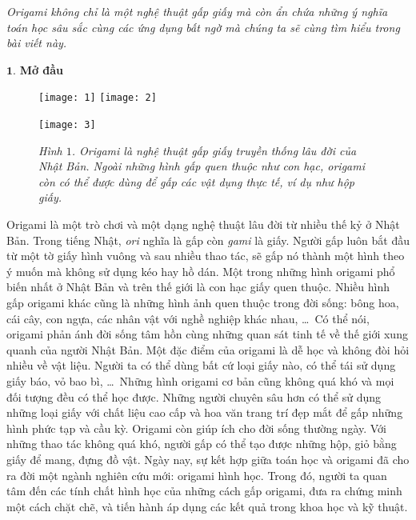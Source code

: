 \textit{Origami không chỉ là một nghệ thuật gấp giấy mà còn ẩn chứa những ý nghĩa toán học sâu sắc cùng các ứng dụng bất ngờ mà chúng ta sẽ cùng tìm hiểu trong bài viết này.}
\begin{multicols}{2}
	$\pmb{1.}$ \textbf{\color{toanhocdoisong}Mở đầu}
	\begin{figure}[H]
		\centering
		\captionsetup{labelformat= empty, justification=centering}
		\texttt{[image: 1]}\hspace*{4pt}
		\texttt{[image: 2]}
		
		\vspace*{4pt}
		\texttt{[image: 3]}
		\caption{\small\textit{\color{toanhocdoisong}Hình $1$. Origami là nghệ thuật gấp giấy truyền thống lâu đời của Nhật Bản. Ngoài những hình gấp quen thuộc như con hạc, origami còn có thể được dùng để gấp các vật dụng thực tế, ví dụ như hộp giấy.}}
		\vspace*{-10pt}
	\end{figure}
	Origami là một trò chơi và một dạng nghệ thuật lâu đời từ nhiều thế kỷ ở Nhật Bản. Trong tiếng Nhật, \textit{ori} nghĩa là gấp còn \textit{gami} là giấy. Người gấp luôn bắt đầu từ một tờ giấy hình vuông và sau nhiều thao tác, sẽ gấp nó thành một hình theo ý muốn mà không sử dụng kéo hay hồ dán.  
	\vskip 0.1cm
	Một trong những hình origami phổ biến nhất ở Nhật Bản và trên thế giới là con hạc giấy quen thuộc. Nhiều hình gấp origami khác cũng là những hình ảnh quen thuộc trong đời sống: bông hoa, cái cây, con ngựa, các nhân vật với nghề nghiệp khác nhau, \ldots\, Có thể nói, origami phản ánh đời sống tâm hồn cùng những quan sát tinh tế về thế giới xung quanh của người Nhật Bản. Một đặc điểm của origami là dễ học và không đòi hỏi nhiều về vật liệu. Người ta có thể dùng bất cứ loại giấy nào, có thể tái sử dụng giấy báo, vỏ bao bì, \ldots\, Những hình origami cơ bản cũng không quá khó và mọi đối tượng đều có thể học được. Những người chuyên sâu hơn có thể sử dụng những loại giấy với chất liệu cao cấp và hoa văn trang trí đẹp mắt để gấp những hình phức tạp và cầu kỳ. Origami còn giúp ích cho đời sống thường ngày. Với những thao tác không quá khó, người gấp có thể tạo được những hộp, giỏ bằng giấy để mang, đựng đồ vật. 
	\vskip 0.1cm
	Ngày nay, sự kết hợp giữa toán học và origami đã cho ra đời một ngành nghiên cứu mới: origami hình học. Trong đó, người ta quan tâm đến các tính chất hình học của những cách gấp origami, đưa ra chứng minh một cách chặt chẽ, và tiến hành áp dụng các kết quả trong khoa học và kỹ thuật. 

\end{multicols}
